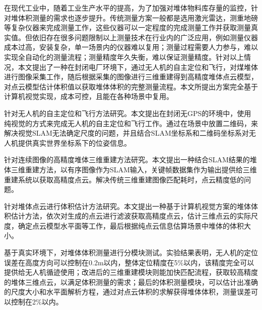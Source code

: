 \begin{cabstract}  
  在现代工业中，随着工业生产水平的提高，为了加强对堆体物料库存量的监控，针对堆体积测量的需求也逐步提升。传统测量方案一般都是选用激光雷达，测重地磅等复杂仪器来完成测量工作，这些仪器可以一定程度的完成测量工作并获取测量真实值。但依旧存在很多问题限制以上测量技术在行业内的广泛应用，例如测量仪器成本过高，安装复杂，单一场景内的仪器难以复用；测量过程需要人力参与，难以实现全自动化的测量流程；测量精度年久失衡，难以保证测量精度。针对以上情况，本文提出了一种在封闭电厂环境下，通过无人机的自主定位和飞行，对煤堆体进行图像采集工作，随后根据采集的图像进行三维重建得到高精度堆体点云模型，对点云模型估计体积值以获取堆体体积的完整测量流程。本文所提出方案完全基于计算机视觉实现，成本可控，且能在各种场景中复用。
  
  针对无人机的自主定位和飞行方法研究。本文提出在封闭无GPS的环境中，使用纯视觉的方式来完成无人机的自主定位和飞行工作。通过在场景中放置二维码，来解决视觉SLAM无法确定尺度的问题，并且结合SLAM坐标系和二维码坐标系对无人机提供真实世界坐标系下的位姿信息。
  
  针对连续图像的高精度堆体三维重建方法研究。本文提出一种结合SLAM结果的堆体三维重建方法，以有序图像作为SLAM输入，关键帧数据集作为输出提供给三维重建系统以获取高精度点云。解决传统三维重建图像匹配耗时，点云精度低的问题。
  
  针对堆体点云进行体积估计方法研究。本文提出一种基于计算机视觉方案的堆体体积估计方法，依次对生成的点云进行滤波获取高精度点云，估计三维点云的实际尺度，确定点云模型水平面等工作，最后根据纯点云信息估算场景中堆体的体积大小。
  
  基于真实环境下，对堆体体积测量进行分模块测试。实验结果表明，无人机的定位误差在高度方向可以控制在0.2m以内，整体定位精度在5$\%$以内，该精度完全可以提供给无人机循迹使用；改进后的三维重建模块则能加快匹配流程，获取较高精度的堆体三维点云，以满足体积测量的需求；最后的体积测量模块，可以估计出准确的尺度大小和水平面解析方程，通过对点云体积的求解获得堆体体积，测量误差可以控制在2$\%$以内。
\end{cabstract}


